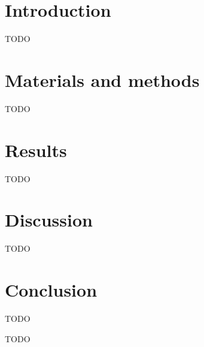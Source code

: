 \documentclass[12pt,a4paper]{article}
\begin{document}
\newpage

\setcounter{page}{1}
\setlength\parindent{24pt}

\newpage

\tableofcontents

\newpage

\section{\label{sec_intro}Introduction}

TODO

\section{Materials and methods}

TODO

\section{Results}

TODO

\section{Discussion}

TODO

\section{Conclusion}

TODO

\newpage




\newpage

\appendix
\setcounter{figure}{0}

TODO
\end{document}
